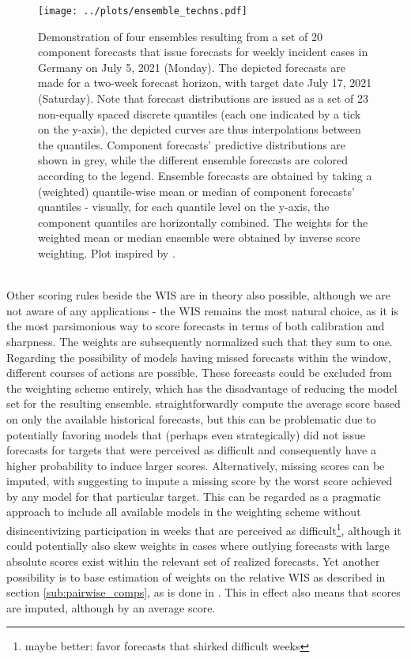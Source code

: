\begin{figure}
\centering
\texttt{[image: ../plots/ensemble\_techns.pdf]}
\caption{Demonstration of four ensembles resulting from a set of 20 component forecasts that issue forecasts for weekly incident cases in Germany on July 5, 2021 (Monday). The depicted forecasts are made for a two-week forecast horizon, with target date July 17, 2021 (Saturday). Note that forecast distributions are issued as a set of 23 non-equally spaced discrete quantiles (each one indicated by a tick on the y-axis), the depicted curves are thus interpolations between the quantiles. Component forecasts' predictive distributions are shown in grey, while the different ensemble forecasts are colored according to the legend. Ensemble forecasts are obtained by taking a (weighted) quantile-wise mean or median of component forecasts' quantiles - visually, for each quantile level on the y-axis, the component quantiles are horizontally combined. The weights for the weighted mean or median ensemble were obtained by inverse score weighting. Plot inspired by \cite{taylor_combining_2021}.}
\label{fig:ensemble_techs}
\end{figure}\\
Other scoring rules beside the WIS are in theory also possible, although we are not aware of any applications - the WIS remains the most natural choice, as it is the most parsimonious way to score forecasts in terms of both calibration and sharpness. The weights are subsequently normalized such that they sum to one. Regarding the possibility of models having missed forecasts within the window, different courses of actions are possible. These forecasts could be excluded from the weighting scheme entirely, which has the disadvantage of reducing the model set for the resulting ensemble. \cite{taylor_combining_2021} straightforwardly compute the average score based on only the available historical forecasts, but this can be problematic due to potentially favoring models that (perhaps even strategically) did not issue forecasts for targets that were perceived as difficult and consequently have a higher probability to induce larger scores. Alternatively, missing scores can be imputed, with \cite{bracher_national_2021} suggesting to impute a missing score by the worst score achieved by any model for that particular target. This can be regarded as a pragmatic approach to include all available models in the weighting scheme without disincentivizing participation in weeks that are perceived as difficult\footnote{maybe better: favor forecasts that shirked difficult weeks}, although it could potentially also skew weights in cases where outlying forecasts with large absolute scores exist within the relevant set of realized forecasts. Yet another possibility is to base estimation of weights on the relative WIS as described in section \ref{sub:pairwise_comps}, as is done in \cite{ray_comparing_2022}. This in effect also means that scores are imputed, although by an average score.\\
